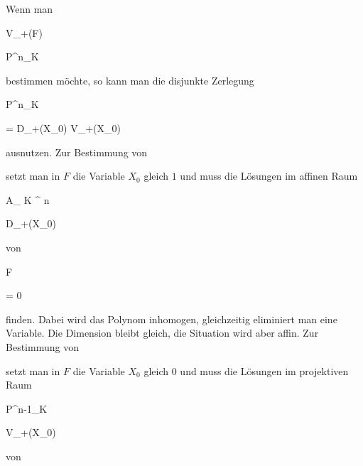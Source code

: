 Wenn man


\mavergleichskette

{\vergleichskette

{ V_+(F)
}

{ \subseteq }{ {\mathbb P}^{n}_{K}
}

{  }{
}

{    }{
}

{   }{
}

}
{}{}{}
bestimmen möchte, so kann man die disjunkte Zerlegung


\mavergleichskettedisp

{\vergleichskette

{ {\mathbb P}^{n}_{K}
}

{ =} { D_+(X_0) \uplus V_+(X_0)
}

{ } {
}

{ } {
}

{ } {
}

}
{}{}{}
 {} {}
ausnutzen. Zur Bestimmung von

 setzt man in $F$ die Variable $X_0$ gleich $1$ und muss die Lösungen im affinen Raum


\mavergleichskette

{\vergleichskette

{ { {\mathbb A}_{ K }^{ n  } }
}

{ \cong }{ D_+(X_0)
}

{  }{
}

{    }{
}

{   }{
}

}
{}{}{}
von


\mavergleichskette

{\vergleichskette

{ F {  }
}

{ = }{ 0
}

{  }{
}

{    }{
}

{   }{
}

}
{}{}{}
finden. Dabei wird das Polynom inhomogen, gleichzeitig eliminiert man eine Variable. Die Dimension bleibt gleich, die Situation wird aber affin. Zur Bestimmung von

 setzt man in $F$ die Variable $X_0$ gleich $0$ und muss die Lösungen im projektiven Raum


\mavergleichskette

{\vergleichskette

{ {\mathbb P}^{n-1}_{K}
}

{ \cong }{ V_+(X_0)
}

{  }{
}

{    }{
}

{   }{
}

}
{}{}{}
von


